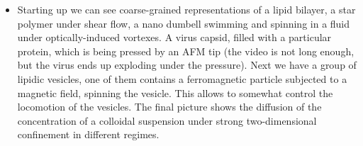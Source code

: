 \documentclass[xcolor=dvipsnames, compress]{beamer}
\begin{document}
\begin{frame}
{\begin{itemize}
    \item Starting up we can see coarse-grained representations of a lipid bilayer, a star polymer under shear flow, a nano dumbell swimming and spinning in a fluid under optically-induced vortexes. A virus capsid, filled with a particular protein, which is being pressed by an AFM tip (the video is not long enough, but the virus ends up exploding under the pressure). Next we have a group of lipidic vesicles, one of them contains a ferromagnetic particle subjected to a magnetic field, spinning the vesicle. This allows to somewhat control the locomotion of the vesicles. The final picture shows the diffusion of the concentration of a colloidal suspension under strong two-dimensional confinement in different regimes.
    \end{itemize}    
  }  
\end{frame}
\end{document}
